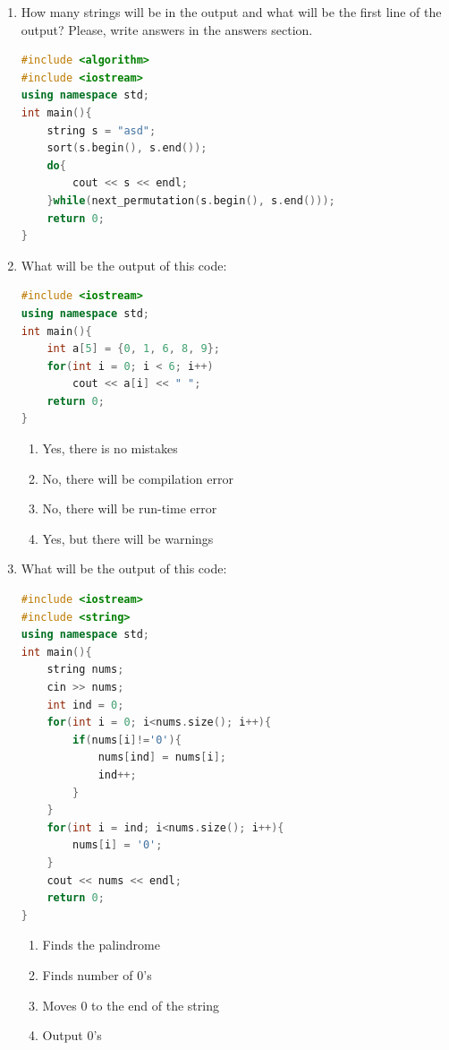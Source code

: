 \documentclass[10pt]{article}
\begin{document}
\begin{enumerate}
\item How many strings will be in the output and what will be the first line of the output? Please, write answers in the answers section.
\begin{lstlisting}[language=C++]
#include <algorithm>
#include <iostream>
using namespace std;
int main(){
    string s = "asd";
    sort(s.begin(), s.end());
    do{
        cout << s << endl;
    }while(next_permutation(s.begin(), s.end()));
    return 0;
}
\end{lstlisting}






\item What will be the output of this code:
\begin{lstlisting}[language=C++]
#include <iostream>
using namespace std;
int main(){
    int a[5] = {0, 1, 6, 8, 9};
    for(int i = 0; i < 6; i++)
        cout << a[i] << " ";
    return 0;
}
\end{lstlisting}
\begin{multicols}{4}
\begin{enumerate}
    \item Yes, there is no mistakes 
    \item No, there will be compilation error 
    \item No, there will be run-time error 
    \item Yes, but there will be warnings 
\end{enumerate}
\end{multicols}







\item What will be the output of this code:
\begin{lstlisting}[language=C++]
#include <iostream>
#include <string>
using namespace std;
int main(){
    string nums;
    cin >> nums;
    int ind = 0;
    for(int i = 0; i<nums.size(); i++){
        if(nums[i]!='0'){
            nums[ind] = nums[i];
            ind++;
        }
    }
    for(int i = ind; i<nums.size(); i++){
        nums[i] = '0';
    }
    cout << nums << endl;
    return 0;
}
\end{lstlisting}
\begin{multicols}{4}
\begin{enumerate}
    \item Finds the palindrome 
    \item Finds number of 0’s 
    \item Moves 0 to the end of the string 
    \item Output 0’s 
\end{enumerate}
\end{multicols}






\end{enumerate}
\end{document}

